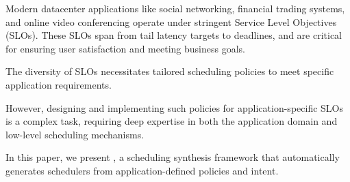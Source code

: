 Modern datacenter applications like social networking, financial trading systems, and online video conferencing operate under stringent Service Level Objectives (SLOs).
These SLOs span from tail latency targets to deadlines, and are critical for ensuring user satisfaction and meeting business goals.

The diversity of SLOs necessitates tailored scheduling policies to meet specific application requirements.

However, designing and implementing such policies for application-specific SLOs is a complex task, requiring deep expertise in both the application domain and low-level scheduling mechanisms.

In this paper, we present \sysname, a scheduling synthesis framework that automatically generates schedulers from application-defined policies and intent.



